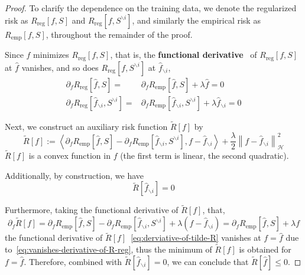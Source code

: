 \begin{proof}
	To clarify the dependence on the training data, we denote the regularized risk as \(R_{\text{reg}}[f, S]\) and \(R_{\text{reg}}[f, S^{\backslash i}]\), and similarly the empirical risk as \(R_{\text{emp}}[f, S]\), throughout the remainder of the proof.

	Since \(\hat{f}\) minimizes \(R_{\text{reg}}[f,S]\), that is, the \textbf{functional derivative}~\cite{stephane2014lecture} of \(R_{\text{reg}}[f,S]\) at \(\hat{f}\) vanishes, and so does \(R_{\text{reg}}[f,S^{\backslash i}]\) at \(\hat{f}_{\backslash i}\),
	\begin{equation}
		\label{eq:vanishes-derivative-of-R-reg}
		\begin{aligned}
			\partial_{f}R_{\text{reg}}\left[\hat{f},S\right]=                               & \partial_{f}R_{\text{emp}}\left[\hat{f},S\right]+\lambda\hat{f}=0                                              \\
			\partial_{f}R_{\text{reg}}\left[\hat{f}_{\backslash i},S^{\backslash i}\right]= & \partial_{f}R_{\text{emp}}\left[\hat{f}_{\backslash i},S^{\backslash i}\right]+\lambda\hat{f}_{\backslash i}=0
		\end{aligned}
	\end{equation}

	Next, we construct an auxiliary risk function \(\tilde{R}[f]\) by
	\begin{equation}
		\tilde{R}[f]:=\left\langle\partial_{f}R_{\text{emp}}\left[\hat{f},S\right]-\partial_{f}R_{\text{emp}}\left[\hat{f}_{\backslash i},S^{\backslash i}\right],f-\hat{f}_{\backslash i}\right\rangle+\frac{\lambda}{2}\left\|f-\hat{f}_{\backslash i}\right\|_{\mathcal{H}}^{2}
	\end{equation}
	\(\tilde{R}[f]\) is a convex function in \(f\) (the first term is linear, the second quadratic).

	Additionally, by construction, we have
	\begin{equation}
		\tilde{R}[\hat{f}_{\backslash i}]=0
	\end{equation}

	Furthermore, taking the functional derivative of \(\tilde{R}[f]\), that,
	\begin{equation}
		\label{eq:derviative-of-tilde-R}
		\partial_{f}\tilde{R}[f]=\partial_{f}R_{\text{emp}}\left[\hat{f},S\right]-\partial_{f}R_{\text{emp}}\left[\hat{f}_{\backslash i},S^{\backslash i}\right]+\lambda\left(f-\hat{f}_{\backslash i}\right)=\partial_{f}R_{\text{emp}}\left[\hat{f},S\right]+\lambda f
	\end{equation}
	the functional derivative of \(\tilde{R}[f]\)~\eqref{eq:derviative-of-tilde-R} vanishes at \(f=\hat{f}\) due to~\eqref{eq:vanishes-derivative-of-R-reg}, thus the minimum of \(\tilde{R}[f]\) is obtained for \(f=\hat{f}\). Therefore, combined with \(\tilde{R}[\hat{f}_{\backslash i}]=0\), we can conclude that \(\tilde{R}[\hat{f}]\leq 0\).


\end{proof}
